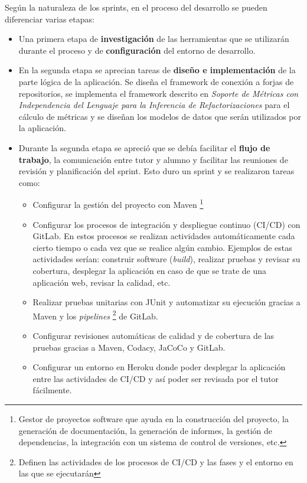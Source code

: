 Según la naturaleza de los sprints, en el proceso del desarrollo se pueden diferenciar varias etapas:
\begin{itemize}
	\item  Una primera etapa de \textbf{investigación} de las herramientas que se utilizarán durante el proceso y de \textbf{configuración} del entorno de desarrollo.
	\item En la segunda etapa se aprecian tareas de \textbf{diseño e implementación} de la parte lógica de la aplicación. Se diseña el framework de conexión a forjas de repositorios, se implementa el framework descrito en \textit{Soporte de Métricas con Independencia del Lenguaje para la Inferencia de Refactorizaciones}  \cite{marticorena_soporte_2005} para el cálculo de métricas y se diseñan los modelos de datos que serán utilizados por la aplicación.
	\item Durante la segunda etapa se apreció que se debía facilitar el \textbf{flujo de trabajo}, la comunicación entre tutor y alumno y facilitar las reuniones de revisión y planificación del sprint. Esto duro un sprint y se realizaron tareas como:
		\begin{itemize}
			\item Configurar la gestión del proyecto con Maven \footnote{Gestor de proyectos software que ayuda en la construcción del proyecto, la generación de documentación, la generación de informes, la gestión de dependencias, la integración con un sistema de control de versiones, etc.}
			\item Configurar los procesos de integración y despliegue continuo (CI/CD) con GitLab. En estos procesos se realizan actividades automáticamente cada cierto tiempo o cada vez que se realice algún cambio. Ejemplos de estas actividades serían: construir software (\textit{build}), realizar pruebas y revisar su cobertura, desplegar la aplicación en caso de que se trate de una aplicación web, revisar la calidad, etc.
			\item Realizar pruebas unitarias con JUnit y automatizar su ejecución gracias a Maven y los \textit{pipelines} \footnote{Definen las actividades de los procesos de CI/CD y las fases y el entorno en las que se ejecutarán} de GitLab.
			\item Configurar revisiones automáticas de calidad y de cobertura de las pruebas gracias a Maven, Codacy, JaCoCo y GitLab.
			\item Configurar un entorno en Heroku donde poder desplegar la aplicación entre las actividades de CI/CD y así poder ser revisada por el tutor fácilmente.

\end{itemize}
\end{itemize}
